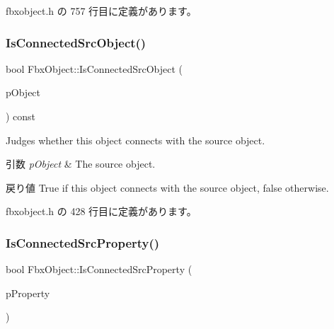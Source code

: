  fbxobject.\+h の 757 行目に定義があります。

\mbox{\label{class_fbx_object_a2ff6d4507136a693622a7d8434b440ed}} 
\subsubsection{\texorpdfstring{Is\+Connected\+Src\+Object()}{IsConnectedSrcObject()}}
{\footnotesize\ttfamily bool Fbx\+Object\+::\+Is\+Connected\+Src\+Object (\begin{DoxyParamCaption}\item[{const \hyperlink{class_fbx_object}{Fbx\+Object} $\ast$}]{p\+Object }\end{DoxyParamCaption}) const\hspace{0.3cm}{\ttfamily [inline]}}

Judges whether this object connects with the source object. 
\begin{DoxyParams}{引数}
{\em p\+Object} & The source object. \\
\hline
\end{DoxyParams}
\begin{DoxyReturn}{戻り値}
{\ttfamily True} if this object connects with the source object, {\ttfamily false} otherwise. 
\end{DoxyReturn}


 fbxobject.\+h の 428 行目に定義があります。

\mbox{\label{class_fbx_object_a7f2c8c668ac8e009584c12f19809be22}} 
\subsubsection{\texorpdfstring{Is\+Connected\+Src\+Property()}{IsConnectedSrcProperty()}}
{\footnotesize\ttfamily bool Fbx\+Object\+::\+Is\+Connected\+Src\+Property (\begin{DoxyParamCaption}\item[{const \hyperlink{class_fbx_property}{Fbx\+Property} \&}]{p\+Property }\end{DoxyParamCaption})\hspace{0.3cm}{\ttfamily [inline]}}

